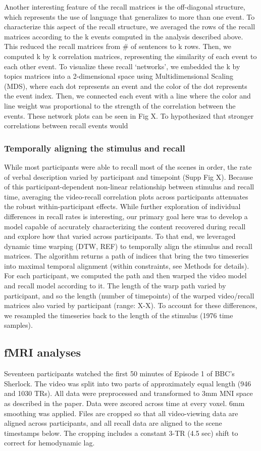 Another interesting feature of the recall matrices is the off-diagonal structure, which represents the use of language that generalizes to more than one event. To characterize this aspect of the recall structure, we averaged the rows of the recall matrices according to the k events computed in the analysis described above.  This reduced the recall matrices from \# of sentences to k rows. Then, we computed k by k correlation matrices, representing the similarity of each event to each other event. To visualize these recall `networks', we embedded the k by topics matrices into a 2-dimensional space using Multidimensional Scaling (MDS), where each dot represents an event and the color of the dot represents the event index.  Then, we connected each event with a line where the color and line weight was proportional to the strength of the correlation between the events. These network plots can be seen in Fig X. To hypothesized that stronger correlations between recall events would

\subsubsection{Temporally aligning the stimulus and recall}
While most participants were able to recall most of the scenes in order, the rate of verbal description varied by participant and timepoint (Supp Fig X). Because of this participant-dependent non-linear relationship between stimulus and recall time, averaging the video-recall correlation plots across participants attenuates the robust within-participant effects. While further exploration of individual differences in recall rates is interesting, our primary goal here was to develop a model capable of accurately characterizing the content recovered during recall and explore how that varied across participants.  To that end, we leveraged dynamic time warping (DTW, REF) to temporally align the stimulus and recall matrices.  The algorithm returns a path of indices that bring the two timeseries into maximal temporal alignment (within constraints, see Methods for details).  For each participant, we computed the path and then warped the video model and recall model according to it. The length of the warp path varied by participant, and so the length (number of timepoints) of the warped video/recall matrices also varied by participant (range: X-X). To account for these differences, we resampled the timeseries back to the length of the stimulus (1976 time samples).

\subsection{fMRI analyses}
Seventeen participants watched the first 50 minutes of Episode 1 of BBC's Sherlock. The video was split into two parts of approximately equal length (946 and 1030 TRs). All data were preprocessed and transformed to 3mm MNI space as described in the paper. Data were zscored across time at every voxel. 6mm smoothing was applied.
Files are cropped so that all video-viewing data are aligned across participants, and all recall data are aligned to the scene timestamps below. The cropping includes a constant 3-TR (4.5 sec) shift to correct for hemodynamic lag.

